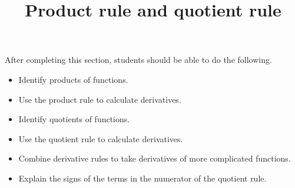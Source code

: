 \documentclass{ximera}
\title{Product rule and quotient rule}
\begin{document}
\begin{abstract}
\end{abstract}

\maketitle

\begin{sectionOutcomes}

After completing this section, students should be able to do the following.

\begin{itemize}
	\item Identify products of functions.
	\item Use the product rule to calculate derivatives.
	\item Identify quotients of functions.
	\item Use the quotient rule to calculate derivatives.
	\item Combine derivative rules to take derivatives of more complicated functions.
        \item Explain the signs of the terms in the numerator of the quotient rule.
\end{itemize}

\end{sectionOutcomes}
\end{document}
